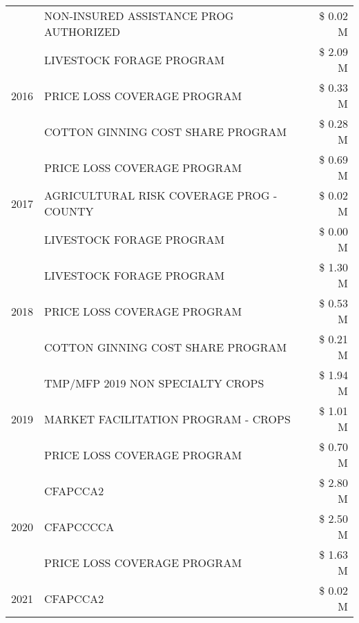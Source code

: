 \begin{tabular}{llr}
 & NON-INSURED ASSISTANCE PROG AUTHORIZED & \$ 0.02 M \\
\cline{1-3}
\multirow[t]{3}{*}{2016} & LIVESTOCK FORAGE PROGRAM & \$ 2.09 M \\
 & PRICE LOSS COVERAGE PROGRAM & \$ 0.33 M \\
 & COTTON GINNING COST SHARE PROGRAM & \$ 0.28 M \\
\cline{1-3}
\multirow[t]{3}{*}{2017} & PRICE LOSS COVERAGE PROGRAM & \$ 0.69 M \\
 & AGRICULTURAL RISK COVERAGE PROG - COUNTY & \$ 0.02 M \\
 & LIVESTOCK FORAGE PROGRAM & \$ 0.00 M \\
\cline{1-3}
\multirow[t]{3}{*}{2018} & LIVESTOCK FORAGE PROGRAM & \$ 1.30 M \\
 & PRICE LOSS COVERAGE PROGRAM & \$ 0.53 M \\
 & COTTON GINNING COST SHARE PROGRAM & \$ 0.21 M \\
\cline{1-3}
\multirow[t]{3}{*}{2019} & TMP/MFP 2019 NON SPECIALTY CROPS & \$ 1.94 M \\
 & MARKET FACILITATION PROGRAM - CROPS & \$ 1.01 M \\
 & PRICE LOSS COVERAGE PROGRAM & \$ 0.70 M \\
\cline{1-3}
\multirow[t]{3}{*}{2020} & CFAPCCA2 & \$ 2.80 M \\
 & CFAPCCCCA & \$ 2.50 M \\
 & PRICE LOSS COVERAGE PROGRAM & \$ 1.63 M \\
\cline{1-3}
2021 & CFAPCCA2 & \$ 0.02 M \\
\cline{1-3}
\bottomrule
\end{tabular}
